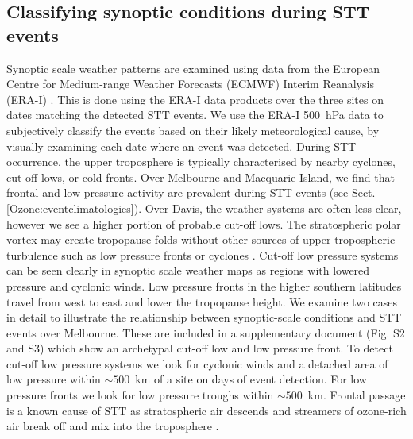   \subsection{Classifying synoptic conditions during STT events}
    \label{Ozone:WeatherClassifications}
    Synoptic scale weather patterns are examined using data from the European Centre for Medium-range Weather Forecasts (ECMWF) Interim Reanalysis (ERA-I) \parencite{Dee2011}.
    This is done using the ERA-I data products over the three sites on dates matching the detected STT events.
    We use the ERA-I 500~hPa data to subjectively classify the events based on their likely meteorological cause, by visually examining each date where an event was detected.
    During STT occurrence, the upper troposphere is typically characterised by nearby cyclones, cut-off lows, or cold fronts.
    Over Melbourne and Macquarie Island, we find that frontal and low pressure activity are prevalent during STT events (see Sect. \ref{Ozone:eventclimatologies}).
    Over Davis, the weather systems are often less clear, however we see a higher portion of probable cut-off lows. 
    The stratospheric polar vortex may create tropopause folds without other sources of upper tropospheric turbulence such as low pressure fronts or cyclones \parencite[e.g.][]{Baray2000,Sprenger2003,Tyrlis2014}.
    Cut-off low pressure systems can be seen clearly in synoptic scale weather maps as regions with lowered pressure and cyclonic winds.
    Low pressure fronts in the higher southern latitudes travel from west to east and lower the tropopause height.
    We examine two cases in detail to illustrate the relationship between synoptic-scale conditions and STT events over Melbourne.
    These are included in a supplementary document (Fig. S2 and S3) which show an archetypal cut-off low and low pressure front.
    To detect cut-off low pressure systems we look for cyclonic winds and a detached area of low pressure within $\sim 500$~km of a site on days of event detection.
    For low pressure fronts we look for low pressure troughs within $\sim 500$~km.
    Frontal passage is a known cause of STT as stratospheric air descends and streamers of ozone-rich air break off and mix into the troposphere \parencite{Sprenger2003}.


